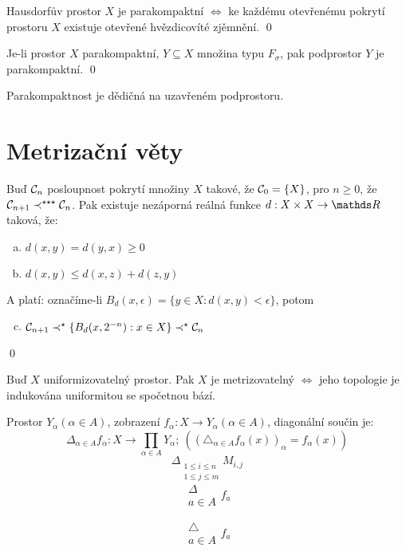 \documentclass[12pt,a4paper]{article}
\newcommand{\head}[1]{\medskip\noindent {\bf #1}}
\begin{document}
\veta Hausdorfův prostor $X$ je parakompaktní $\iff$ ke každému otevřenému
	pokrytí prostoru $X$ existuje otevřené hvězdicovíté zjěmnění.
\dukaz \qed

\veta Je-li prostor $X$ parakompaktní, $Y \subseteq X$ množina typu $F_\sigma$,
	pak podprostor $Y$ je parakompaktní.
\dukaz \qed

\head {Důsledek:} Parakompaktnost je dědičná na uzavřeném podprostoru.

\section{Metrizační věty}
\lemma Buď $\mathcal{ C }_n$ posloupnost pokrytí množiny $X$ takové, že $\mathcal{ C }_0 =
	\{X\}$, pro $n \geq 0$, že\\$\mathcal{ C }_{n+1} \prec^{\star\star\star} \mathcal{ C }_n$. Pak
	existuje nezáporná reálná funkce $d : X \times X \to \m R$ taková, že:

	\begin{enumerate}[(a)]
		\item $d(x,y) = d(y,x) \geq 0$
		\item $d(x,y) \leq d(x,z) + d(z,y)$
	\end{enumerate}
	A platí: označíme-li $B_d(x,\epsilon) = \{y \in X : d(x,y) < \epsilon \}$, potom
	\begin{enumerate}[(a)]
		\setcounter{enumi}{2}
		\item $\mathcal{ C }_{n+1} \prec^{\star} \{ B_d(x,2^{-n}) : x \in X\} \prec^{\star} \mathcal{ C }_n$
	\end{enumerate}
\dukaz \qed

\veta [P. S. Uryshon] Buď $X$ uniformizovatelný prostor. Pak $X$ je
	metrizovatelný $\iff$ jeho topologie je indukována uniformitou se spočetnou
	bází.

	Prostor $Y_\alpha (\alpha \in A)$, zobrazení $f_\alpha : X \to Y_\alpha (\alpha \in A)$,
	diagonální součin je:
		$$\Delta_{\alpha \in A} f_\alpha : X \to \prod_{\alpha \in A} Y_\alpha;~((\triangle_{\alpha \in A} f_\alpha(x))_\alpha = f_\alpha(x))$$
\begin{equation}
  \Delta_{\substack{
            1\le i \le n\\
            1\le j \le m}}
     M_{i,j}
\end{equation}
 $$
 \substack{ \Delta \\ a \in A } f_a
 $$

 $$
 \substack{ \triangle \\ a \in A } f_a
 $$
\end{document}
